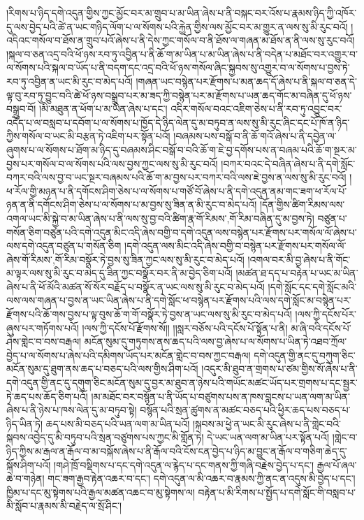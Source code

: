 །རིགས་པ་ཉིད་དགེ་འདུན་གྱིས་ཀྱང་མྱོང་བར་མ་གྲུབ་པ་མ་ཡིན་ཞེས་པ་ནི་བསྐང་བར་འོས་པ་རྣམས་ཉིད་ཀྱི་འཁོར་དུ་ལས་བྱེད་པའི་ཚེ་ན་ཡང་གཉིད་ལོག་པ་ལ་སོགས་པའི་རྐྱེན་གྱིས་ལས་མྱོང་བར་མ་གྱུར་ན་ལས་སུ་མི་རུང་བའོ། །འདིའང་གསོལ་བ་ཐོས་ན་གྲུབ་པའོ་ཞེས་པ་ནི་དེས་ཀྱང་གསོལ་བ་ནི་ཐོས་ལ་གཞན་མ་ཐོས་ན་ནི་ལས་སུ་རུང་བའོ། །སྐལ་བ་ཅན་འདྲ་བའི་ཕོ་ཉས་རབ་ཏུ་འབྱིན་པ་ནི་ཆོ་ག་མ་ཡིན་པ་མ་ཡིན་ཞེས་པ་ནི་བདེན་པ་མཐོང་བར་འགྱུར་བ་ལ་སོགས་པའི་སྐལ་བ་ཡོད་པ་ནི་བདག་དང་འདྲ་བའི་ཕོ་ཉས་གསོལ་ཞིང་སྐྱབས་སུ་འགྱུར་བ་ལ་སོགས་པ་བྱས་ཏེ་རབ་ཏུ་འབྱིན་ན་ཡང་མི་རུང་བ་མེད་པའོ། །གཞན་ཡང་བསྙེན་པར་རྫོགས་པ་མན་ཆད་དོ་ཞེས་པ་ནི་སྐལ་བ་ཅན་དེ་ལྟ་བུ་རབ་ཏུ་བྱུང་བའི་ཚེ་ཕོ་ཉས་བསྒྲུབ་པར་མ་ཟད་ཀྱི་བསྙེན་པར་མ་རྫོགས་པ་ཡན་ཆད་གོང་མ་བཞིན་དུ་ཕོ་ཉས་བསྒྲུབ་བོ། །མི་མཐུན་ན་ཕོག་པ་མ་ཡིན་ཞེས་པ་དང་། འདིར་གསོལ་བའང་འཇིག་ཅེས་པ་ནི་རབ་ཏུ་འབྱུང་བར་འདོད་པ་ལ་བསླབ་པ་དབོག་པ་ལ་སོགས་པ་ཁྱོད་དེ་ཉིད་ལེན་དུ་མ་བཏུབ་ན་ལས་སུ་མི་རུང་ཞིང་དང་པོ་ཁོ་ན་ཉིད་ཀྱིས་གསོལ་བ་ཡང་མི་བརྩན་ཏེ་འཇིག་པར་སྟོན་པའོ། །བཞམས་པས་བསྒོ་བ་ནི་ཆོ་གའོ་ཞེས་པ་ནི་དབྱེན་ལ་ཞུགས་པ་ལ་སོགས་པ་ཐོག་མ་ཉིད་དུ་བཞམས་ཤིང་བསྒོ་བ་བའི་ཆོ་ག་ཇེ་བྱ་དགོས་པས་ན་བཞམ་པའི་ཆོ་ག་སྔར་མ་བྱས་པར་གསོལ་བ་ལ་སོགས་པའི་ལས་བྱས་ཀྱང་ལས་སུ་མི་རུང་བའོ། །བཀར་བའང་དེ་བཞིན་ཞེས་པ་ནི་དགེ་སློང་བཀར་བའི་ལས་བྱ་བ་ཡང་སྔར་བཞམས་པའི་ཆོ་ག་མ་བྱས་པར་བཀར་བའི་ལས་ཇེ་བྱས་ན་ལས་སུ་མི་རུང་བའོ། །ཕ་རོལ་གྱི་མཉན་པ་ནི་དགོངས་ཤིག་ཅེས་པ་ལ་སོགས་པ་གཙོ་བོ་ཞེས་པ་ནི་དགེ་འདུན་ནམ་གང་ཟག་ཕ་རོལ་པོ་ཉན་ན་ནི་དགོངས་ཤིག་ཅེས་པ་ལ་སོགས་པ་མ་བྱས་སུ་ཟིན་ན་མི་རུང་བ་མེད་པའོ། །དོན་གྱིས་ཚིག་རིམས་ལས་འགལ་ཡང་མི་སྐྱེ་བ་མ་ཡིན་ཞེས་པ་ནི་ལས་སུ་བྱ་བའི་ཚིག་རྣ་{གོ་རིམས་,གོ་རིམ་}བཞིན་དུ་མ་བྱས་ཏེ། བཙུན་པ་གསོན་ཅིག་བཙུན་པའི་དགེ་འདུན་མིང་འདི་ཞེས་བགྱི་བ་དགེ་འདུན་ལས་བསྙེན་པར་རྫོགས་པར་གསོལ་ལོ་ཞེས་པ་ལས་དགེ་འདུན་བཙུན་པ་གསོན་ཅིག །དགེ་འདུན་ལས་མིང་འདི་ཞེས་བགྱི་བ་བསྙེན་པར་རྫོགས་པར་གསོལ་ལོ་ཞེས་{གོ་རིམས་,གོ་རིམ་}བསྣོར་ཏེ་བྱས་སུ་ཟིན་ཀྱང་ལས་སུ་མི་རུང་བ་མེད་པའོ། །འགལ་བར་མི་བྱ་ཞེས་པ་ནི་གོང་མ་ལྟར་ལས་སུ་མི་རུང་བ་མེད་དུ་ཟིན་ཀྱང་བསྣོར་བར་ནི་མ་བྱེད་ཅིག་པའོ། །མཚན་ཐ་དད་པ་བརྟེན་པ་ཡང་མ་ཡིན་ཞེས་པ་ནི་ཕོ་མོའི་མཚན་སོ་སོར་བརྗོད་པ་བསྣོར་ན་ཡང་ལས་སུ་མི་རུང་བ་མེད་པའོ། །དགེ་སློང་དང་དགེ་སློང་མའི་ལས་ལས་གཞན་པ་བྱས་ན་ཡང་ཡིན་ཞེས་པ་ནི་དགེ་སློང་ཕ་བསྙེན་པར་རྫོགས་པའི་ལས་དགེ་སློང་མ་བསྙེན་པར་རྫོགས་པའི་ཆོ་གས་བྱས་པ་ལྟ་བུས་ཆོ་ག་གོ་བསྣོར་ཏེ་བྱས་ན་ཡང་ལས་སུ་མི་རུང་བ་མེད་པའོ། །ལས་ཀྱི་དངོས་པོར་ཞུས་པར་གཏོགས་པའོ། །ལས་ཀྱི་དངོས་པོ་རྫོགས་སོ།། །།སླར་བཅོས་པའི་དངོས་པོ་སྟོན་པ་ནི། མ་ཞི་བའི་དངོས་པོ་ཤེས་གླེང་བ་བས་བརྒལ། མངོན་སུམ་དུ་གཏུགས་ནས་ཆད་པའི་ལས་བྱ་ཞེས་པ་ལ་སོགས་པ་ཡིན་ཏེ་འཐབ་ཀྲོལ་བྱེད་པ་ལ་སོགས་པ་ཞེས་པའི་དམིགས་ཡོད་པར་མངོན་གླེང་བ་བས་ཀྱང་བརྒལ། དགེ་འདུན་གྱི་ནང་དུ་བཀུག་ཅིང་མངོན་སུམ་དུ་ཐུག་ནས་ཆད་པ་བཅད་པའི་ལས་གྱིས་ཤིག་པའོ། །འདུར་མི་ཐུབ་ན་གྲགས་པ་ཙམ་གྱིས་སོ་ཞེས་པ་ནི་དགེ་འདུན་གྱི་ནང་དུ་དགུག་ཅིང་མངོན་སུམ་དུ་བྱར་མ་ཐུབ་ན་ཉེས་པའི་གཡོང་མཚང་ཡོད་པར་གྲགས་པ་དང་སྦྱར་ཏེ་ཆད་པས་ཆོད་ཅིག་པའོ། །མ་མཐོང་བར་བསྙོན་པ་ནི་ཡོད་པ་བཙུགས་པས་ན་ཁས་བླངས་པ་ཡན་ལག་མ་ཡིན་ཞེས་པ་ནི་ཉེས་པ་ཁས་ལེན་དུ་མ་བཏུབ་སྟེ། བསྙོན་པའི་སྲན་ཚུགས་ན་མཚང་བཅད་པའི་ཕྱིར་ཆད་པས་བཅད་པ་ཉིད་ཡིན་ཏེ། ཆད་པས་མི་བཅད་པའི་ཡན་ལག་མ་ཡིན་པའོ། །སྐབས་མ་ཕྱེ་ན་ཡང་མི་རུང་ཞེས་པ་ནི་གླེང་བའི་སྐབས་འབྱེད་དུ་མི་བཏུབ་པའི་སྲན་བཙུགས་པས་ཀྱང་མི་གློན་ཏེ། དེ་ཡང་ཡན་ལག་མ་ཡིན་པར་སྟོན་པའོ། །གླེང་བ་ཉིད་ཀྱིས་མ་རྒལ་ན་རྒོལ་བ་མ་བསྐོས་ཞེས་པ་ནི་རྒོལ་བའི་ངོས་ངན་བྱེད་པ་ཉིད་མ་བྱུང་ན་རྒོལ་བ་གཅིག་ཆེད་དུ་སྐོས་ཤིག་པའོ། །གཤེ་ཁྲོ་བསྡིགས་པ་དང་དགེ་འདུན་ལ་རྙེད་པ་དང་གནས་ཀྱི་གཞི་བརྗེས་བྱེད་པ་དང་། རྒྱལ་པོ་ཞལ་ཆེ་བ་གཉེན། གང་ཟག་རྒྱབ་རྟེན་འཆར་བ་དང་། དགེ་འདུན་ལ་མི་འཆར་བ་རྣམས་ཀྱི་ནང་ན་འདུས་མི་བྱེད་པ་དང་། ཁྱིམ་པ་དང་མུ་སྟེགས་པའི་རྒྱལ་མཚན་འཆང་བ་མུ་སྟེགས་ལ། བརྟེན་པ་མི་རིགས་པ་སྤྱོད་པ་དགེ་སློང་གི་བསླབ་པ་མི་སློབ་པ་རྣམས་མི་བརྗེད་ལ་སྲོ་ཤིང་། 